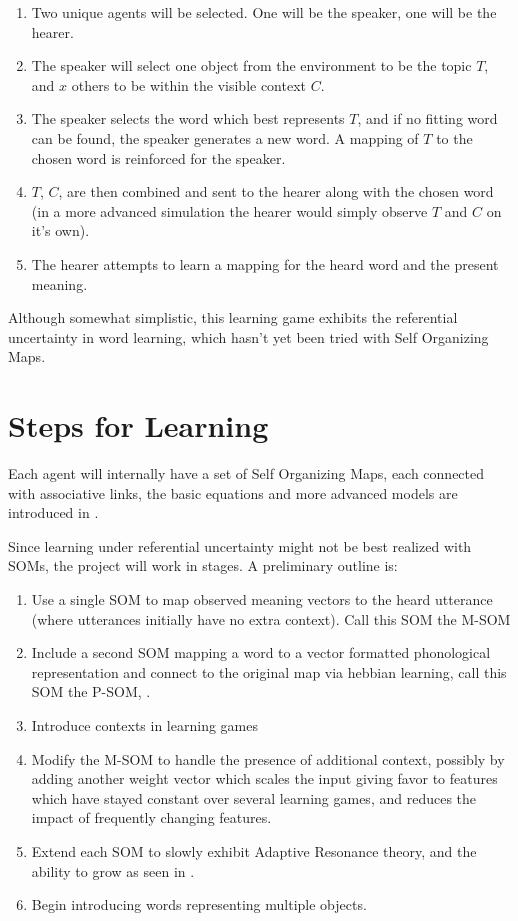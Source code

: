 \documentclass[11pt]{article}
\begin{document}
\begin{enumerate}
  \item Two unique agents will be selected.  One will be the speaker, one will
  be the hearer.
  \item The speaker will select one object from the environment to be the topic
  $T$, and $x$ others to be within the visible context $C$.
  \item The speaker selects the word which best represents $T$, and if no
  fitting word can be found, the speaker generates a new word.  A mapping of $T$
  to the chosen word is reinforced for the speaker.
  \item $T$, $C$, are then combined and sent to the hearer along with the chosen word (in a more advanced simulation the hearer would simply observe $T$ and $C$ on it's own).
  \item The hearer attempts to learn a mapping for the heard word and the
  present meaning.
\end{enumerate}

Although somewhat simplistic, this learning game exhibits the referential
uncertainty in word learning, which hasn't yet been tried with Self Organizing
Maps.

\section{Steps for Learning}
Each agent will internally have a set of Self Organizing Maps, each connected
with associative links, the basic equations and more advanced models are introduced in
\cite{liDevLex,DisLex}.  

Since learning under referential uncertainty might not be best realized with
SOMs, the project will work in stages.  A preliminary outline is:

\begin{enumerate}
  \item Use a single SOM to map observed meaning vectors to the heard utterance
  (where utterances initially have no extra context).  Call this SOM the M-SOM
  \item Include a second SOM mapping a word to a vector formatted phonological
  representation and connect to the original map via hebbian learning, call this
  SOM the P-SOM, \cite{liDevLex}.
  \item Introduce contexts in learning games
  \item Modify the M-SOM to handle the presence of additional context, possibly
  by adding another weight vector which scales the input giving favor to
  features which have stayed constant over several learning games, and reduces
  the impact of frequently changing features.
  \item Extend each SOM to slowly exhibit Adaptive Resonance theory, and the
  ability to grow as seen in \cite{liDevLex}.
  \item Begin introducing words representing multiple objects.
\end{enumerate}
\end{document}
